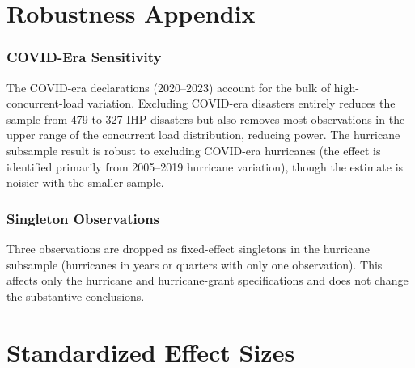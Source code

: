 \documentclass[12pt]{article}
\begin{document}
\section{Robustness Appendix}

\subsubsection*{COVID-Era Sensitivity} The COVID-era declarations (2020--2023) account for the bulk of high-concurrent-load variation. Excluding COVID-era disasters entirely reduces the sample from 479 to 327 IHP disasters but also removes most observations in the upper range of the concurrent load distribution, reducing power. The hurricane subsample result is robust to excluding COVID-era hurricanes (the effect is identified primarily from 2005--2019 hurricane variation), though the estimate is noisier with the smaller sample.

\subsubsection*{Singleton Observations} Three observations are dropped as fixed-effect singletons in the hurricane subsample (hurricanes in years or quarters with only one observation). This affects only the hurricane and hurricane-grant specifications and does not change the substantive conclusions.

\section{Standardized Effect Sizes}
\label{sec:sde}


\end{document}
